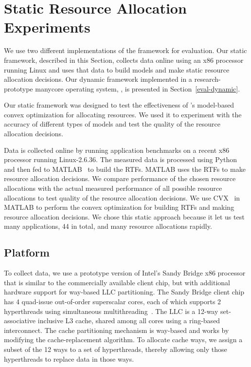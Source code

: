 \section{Static Resource Allocation Experiments}\label{eval-static}


We use two different implementations of the \pacora framework for evaluation. Our static framework, described in this Section, collects data online using an x86 processor running Linux and uses that data to build models and make static resource allocation decisions.  Our dynamic framework implemented in a research-prototype manycore operating system, \tess, is presented in Section~\ref{eval-dynamic}.

Our static framework was designed to test the effectiveness of \pacora's model-based convex optimization for allocating resources.  We used it to experiment with the accuracy of different types of models and test the quality of the resource allocation decisions.

Data is collected online by running application benchmarks on a recent x86 processor running Linux-2.6.36.  The measured data is processed using Python and then fed to MATLAB~\cite{matlab} to build the RTFs.  MATLAB uses the RTFs to make resource allocation decisions.  We compare performance of the chosen resource allocations with the actual measured performance of all possible resource allocations to test quality of the resource allocation decisions. We use CVX~\cite{cvx} in MATLAB to perform the convex optimization for building RTFs and making resource allocation decisions.  We chose this static approach because it let us test many applications, 44 in total, and many resource allocations rapidly.

\subsection{Platform}

To collect data, we use a prototype version of Intel's Sandy Bridge x86 processor that is similar to the
commercially available client chip, but with additional hardware
support for way-based LLC partitioning.
The Sandy Bridge client chip has 4 quad-issue out-of-order
superscalar cores, each of which supports 2 hyperthreads using
simultaneous multithreading~\cite{IntelRefManual:2011}.
The LLC is a 12-way
set-associative  inclusive L3 cache, shared among all
cores using a ring-based interconnect.
The cache partitioning mechanism is way-based and works by modifying the
cache-replacement algorithm.  To allocate cache ways, we assign a subset of
the 12 ways to a set of hyperthreads, thereby allowing only those hyperthreads to replace data in those ways.


